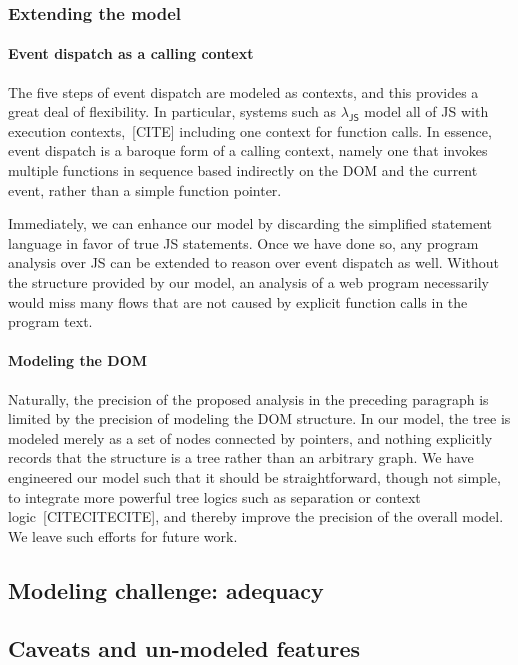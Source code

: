 \documentclass[letterpaper,10pt,twocolumn]{article}
\DeclareRobustCommand{\spec}[1]{\textsf{#1}\xspace}
\DeclareRobustCommand\JS{\spec{JS}}
\DeclareRobustCommand{\LJS}{\ensuremath{\lambda_\JS}\xspace}
\begin{document}
\subsubsection{Extending the model}
\paragraph{Event dispatch as a calling context} 
The five steps of event dispatch are modeled as contexts, and this
provides a great deal of flexibility.  In particular, systems such as
\LJS model all of \JS with execution contexts,~[CITE] including one context
for function calls.  In essence, event dispatch is a baroque form of a
calling context, namely one that invokes multiple functions in
sequence based indirectly on the DOM and the current event, rather
than a simple function pointer.

Immediately, we can enhance our model by discarding the simplified
statement language in favor of true \JS statements.  Once we have done
so, any program analysis over \JS can be extended to reason over event
dispatch as well.  Without the structure provided by our model, an
analysis of a web program necessarily would miss many flows that are
not caused by explicit function calls in the program text.

\paragraph{Modeling the DOM} Naturally, the precision of the proposed
analysis in the preceding paragraph is limited by the precision of
modeling the DOM structure.  In our model, the tree is modeled merely
as a set of nodes connected by pointers, and nothing explicitly
records that the structure is a tree rather than an arbitrary graph.
We have engineered our model such that it should be straightforward,
though not simple, to integrate more powerful tree logics such as
separation or context logic~[CITECITECITE], and thereby improve the
precision of the overall model.  We leave such efforts for future
work.

\subsection{Modeling challenge: adequacy}
\lipsum[1-2]

\subsection{Caveats and un-modeled features}
\end{document}
